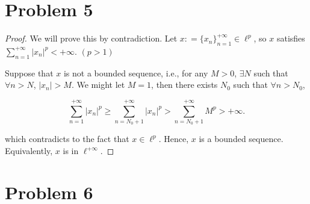 \documentclass[12pt]{article}
\begin{document}
\section*{Problem 5}

\begin{proof}
We will prove this by contradiction. Let $x: = \{x_n\}_{n=1}^{+\infty} \in \ell^p$, so $x$ satisfies $\sum_{n=1}^{+\infty} |x_n|^p < +\infty$. $(p > 1)$

Suppose that $x$ is not a bounded sequence, i.e., for any $M > 0$, $\exists N$ such that $\forall n > N$, $|x_n| > M$. We might let $M = 1$, then there exists $N_0$ such that 
$\forall n > N_0$,

$$
\sum_{n = 1}^{+\infty} |x_n|^p \geqslant \sum_{n = N_0 + 1}^{+\infty} |x_n|^p > \sum_{n = N_0 + 1}^{+\infty} M^p > +\infty.
$$

which contradicts to the fact that $x \in \ell^p$. Hence, $x$ is a bounded sequence. Equivalently, $x$ is in $\ell^{+\infty}$.

\end{proof}

\section*{Problem 6}
\end{document}

